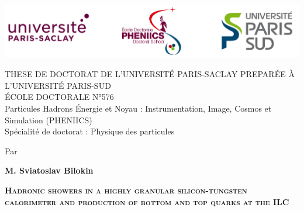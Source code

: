\documentclass[12pt]{article}
\begin{document}

\usetikzlibrary{calc}
\thispagestyle{empty}


{\begin{center}
	\vspace{-3.5cm}
	\includegraphics[width=14cm]{Logo_ALL.png}\\
	\vspace{1cm}
	
	\textcolor{violet!80!red!80!black}{{{\uppercase{\Large These de Doctorat de L'Universit\'{e} Paris-Saclay Prepar\'{e}e \`{a} l'Universit\'{e} Paris-Sud}}}}\\
	\vspace{1cm}
	\'{E}COLE DOCTORALE N°576\\
	Particules Hadrons \'{E}nergie et Noyau : Instrumentation, Image, Cosmos et Simulation (PHENIICS)\\
	Sp\'{e}cialit\'{e} de doctorat : Physique des particules\par
	\vspace{1.cm}
 	Par\par  \large \textbf{M. Sviatoslav Bilokin} \par
	\vspace{0.5cm}
	\Large \textsc{\textcolor{SchoolColor}{
	\textbf{Hadronic showers in a highly granular silicon-tungsten calorimeter and production of bottom and top quarks at the ILC}}}\par
\end{center}

}
\end{document}
